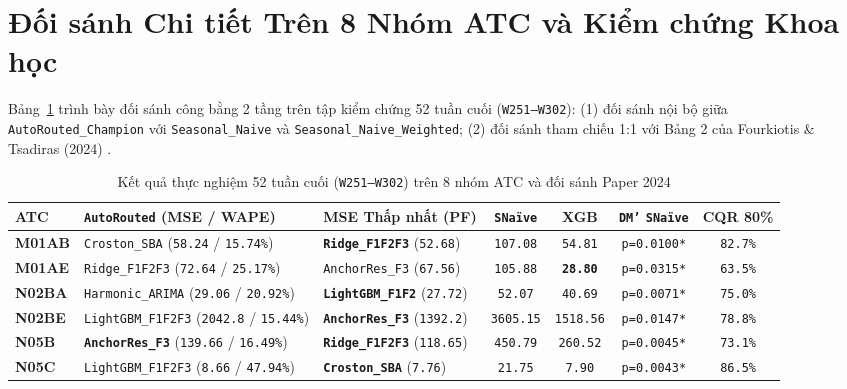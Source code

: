 \section{Đối sánh Chi tiết Trên 8 Nhóm ATC và Kiểm chứng Khoa học}
Bảng~\ref{tab:ml_benchmark_8atc} trình bày đối sánh công bằng 2 tầng trên tập kiểm chứng 52 tuần cuối (\texttt{W251--W302}): (1) đối sánh nội bộ giữa \texttt{AutoRouted\_Champion} với \texttt{Seasonal\_Naive} và \texttt{Seasonal\_Naive\_Weighted}; (2) đối sánh tham chiếu 1:1 với Bảng 2 của Fourkiotis \& Tsadiras (2024) \cite{fourkiotis2024}.

\begin{table}[H]
\centering
\caption{Kết quả thực nghiệm 52 tuần cuối (\texttt{W251--W302}) trên 8 nhóm ATC và đối sánh Paper 2024 \cite{fourkiotis2024}}
\label{tab:ml_benchmark_8atc}
\renewcommand{\arraystretch}{1.20}
\setlength{\tabcolsep}{3.5pt}
\scriptsize
\begin{tabularx}{\textwidth}{|l|X|p{}|c|c|c|c|}
\hline
\textbf{ATC} & \textbf{\texttt{AutoRouted} (MSE / WAPE)} & \textbf{MSE Thấp nhất (PF)} & \textbf{\texttt{SNaïve}} & \textbf{XGB \cite{fourkiotis2024}} & \textbf{\texttt{DM'} \texttt{SNaïve}} & \textbf{CQR 80\%} \\
\hline
\textbf{M01AB} & \texttt{Croston\_SBA} (\texttt{58.24} / \texttt{15.74\%}) & \textbf{\texttt{Ridge\_F1F2F3}} (\texttt{52.68}) & \texttt{107.08} & \texttt{54.81} & \texttt{p=0.0100*} & \texttt{82.7\%} \\
\hline
\textbf{M01AE} & \texttt{Ridge\_F1F2F3} (\texttt{72.64} / \texttt{25.17\%}) & \texttt{AnchorRes\_F3} (\texttt{67.56}) & \texttt{105.88} & \textbf{\texttt{28.80}} & \texttt{p=0.0315*} & \texttt{63.5\%} \\
\hline
\textbf{N02BA} & \texttt{Harmonic\_ARIMA} (\texttt{29.06} / \texttt{20.92\%}) & \textbf{\texttt{LightGBM\_F1F2}} (\texttt{27.72}) & \texttt{52.07} & \texttt{40.69} & \texttt{p=0.0071*} & \texttt{75.0\%} \\
\hline
\textbf{N02BE} & \texttt{LightGBM\_F1F2F3} (\texttt{2042.8} / \texttt{15.44\%}) & \textbf{\texttt{AnchorRes\_F3}} (\texttt{1392.2}) & \texttt{3605.15} & \texttt{1518.56} & \texttt{p=0.0147*} & \texttt{78.8\%} \\
\hline
\textbf{N05B} & \textbf{\texttt{AnchorRes\_F3}} (\texttt{139.66} / \texttt{16.49\%}) & \textbf{\texttt{Ridge\_F1F2F3}} (\texttt{118.65}) & \texttt{450.79} & \texttt{260.52} & \texttt{p=0.0045*} & \texttt{73.1\%} \\
\hline
\textbf{N05C} & \texttt{LightGBM\_F1F2F3} (\texttt{8.66} / \texttt{47.94\%}) & \textbf{\texttt{Croston\_SBA}} (\texttt{7.76}) & \texttt{21.75} & \texttt{7.90} & \texttt{p=0.0043*} & \texttt{86.5\%} \\

\end{tabularx}
\end{table}
